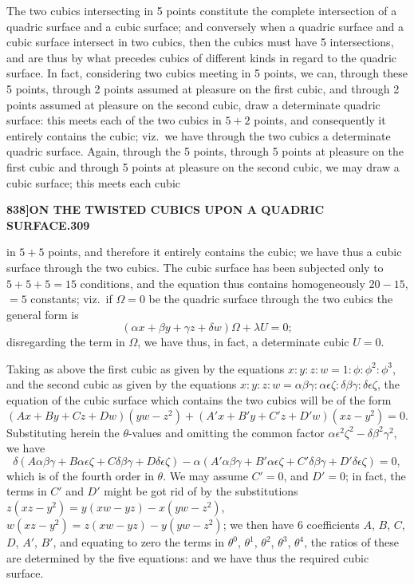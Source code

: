 \documentclass[12pt,a4paper]{article}
\theoremstyle{definition}
\begin{document}
The two cubics intersecting in 5 points constitute the complete intersection of a quadric surface and a cubic surface; and conversely when a quadric surface and a cubic surface intersect in two cubics, then the cubics must have 5 intersections, and are thus by what precedes cubics of different kinds in regard to the quadric surface. In fact, considering two cubics meeting in 5 points, we can, through these 5 points, through 2 points assumed at pleasure on the first cubic, and through 2 points assumed at pleasure on the second cubic, draw a determinate quadric surface: this meets each of the two cubics in $5 + 2$ points, and consequently it entirely contains the cubic; viz.\ we have through the two cubics a determinate quadric surface. Again, through the 5 points, through 5 points at pleasure on the first cubic and through 5 points at pleasure on the second cubic, we may draw a cubic surface; this meets each cubic

\newpage
\setcounter{page}{309}

\noindent\textbf{838]}\hfill\textbf{ON THE TWISTED CUBICS UPON A QUADRIC SURFACE.}\hfill\textbf{309}

\bigskip

\noindent in $5 + 5$ points, and therefore it entirely contains the cubic; we have thus a cubic surface through the two cubics. The cubic surface has been subjected only to $5 + 5 + 5 = 15$ conditions, and the equation thus contains homogeneously $20 - 15$, $= 5$ constants; viz.\ if $\Omega = 0$ be the quadric surface through the two cubics the general form is
\[
(\alpha x + \beta y + \gamma z + \delta w)\Omega + \lambda U = 0;
\]
disregarding the term in $\Omega$, we have thus, in fact, a determinate cubic $U = 0$.

Taking as above the first cubic as given by the equations $x : y : z : w = 1 : \phi : \phi^2 : \phi^3$, and the second cubic as given by the equations $x : y : z : w = \alpha\beta\gamma : \alpha\epsilon\zeta : \delta\beta\gamma : \delta\epsilon\zeta$, the equation of the cubic surface which contains the two cubics will be of the form
\[
(Ax + By + Cz + Dw)(yw - z^2) + (A'x + B'y + C'z + D'w)(xz - y^2) = 0.
\]
Substituting herein the $\theta$-values and omitting the common factor $\alpha\epsilon^2\zeta^2 - \delta\beta^2\gamma^2$, we have
\[
\delta(A\alpha\beta\gamma + B\alpha\epsilon\zeta + C\delta\beta\gamma + D\delta\epsilon\zeta) - \alpha(A'\alpha\beta\gamma + B'\alpha\epsilon\zeta + C'\delta\beta\gamma + D'\delta\epsilon\zeta) = 0,
\]
which is of the fourth order in $\theta$. We may assume $C' = 0$, and $D' = 0$; in fact, the terms in $C'$ and $D'$ might be got rid of by the substitutions $z(xz - y^2) = y(xw - yz) - x(yw - z^2)$, $w(xz - y^2) = z(xw - yz) - y(yw - z^2)$; we then have 6 coefficients $A$, $B$, $C$, $D$, $A'$, $B'$, and equating to zero the terms in $\theta^0$, $\theta^1$, $\theta^2$, $\theta^3$, $\theta^4$, the ratios of these are determined by the five equations: and we have thus the required cubic surface.
\end{document}
